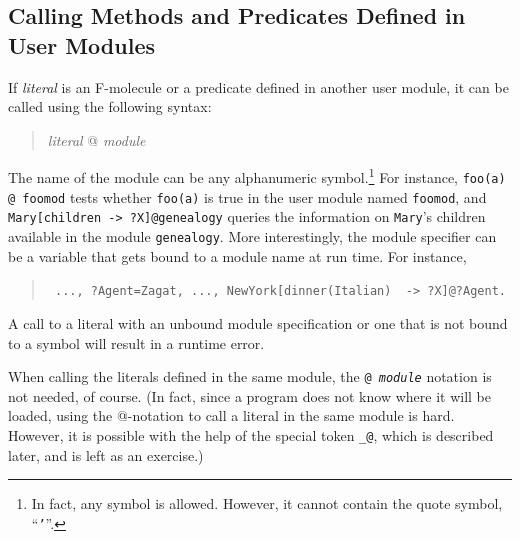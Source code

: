 \documentclass[11pt]{article}
\makeatletter
\newcommand{\thismodule}{{\tt \_@}\xspace}
\newcommand{\mvd}{{\mbox{\tt \,->\,}}}  %
\makeatother
\begin{document}
\subsection{Calling Methods and Predicates Defined in User Modules}


%
If \emph{literal} is an F-molecule or a predicate defined in another
user module, it can be called using the following syntax:
\begin{quote}
\emph{literal} @ \emph{module} 
\end{quote}
The name of the module can be any alphanumeric symbol.\footnote{
  In fact, any symbol is allowed. However, it cannot contain the quote
  symbol, ``{\tt '}''.
  }
For instance, \verb|foo(a) @ foomod| tests whether {\tt foo(a)} is true in
the user module named {\tt foomod}, and {\tt Mary[children\mvd ?X]@genealogy}
queries the information on {\tt Mary}'s children available in the module
{\tt genealogy}. More interestingly, the module specifier can be a variable
that gets bound to a module name at run time. For instance, 
\begin{quote}
 {\tt
   ..., ?Agent=Zagat, ..., NewYork[dinner(Italian) \mvd ?X]@?Agent.
   }
\end{quote}
A call to a literal with an unbound module specification or one that is not
bound to a symbol will result in a runtime error.

When calling the literals defined in the same module, the {\tt @{\it
    module}} notation is not needed, of course. (In fact, since a program
does not know where it will be loaded, using the @-notation to call a
literal in the same module is hard. However, it is possible with the help
of the special token \thismodule, which is described later, and is left
as an exercise.)
\end{document}

